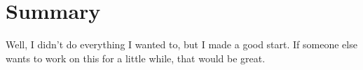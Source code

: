 \chapter{Summary}

Well, I didn't do everything I wanted to, but I made a good start.  If someone
else wants to work on this for a little while, that would be great.
